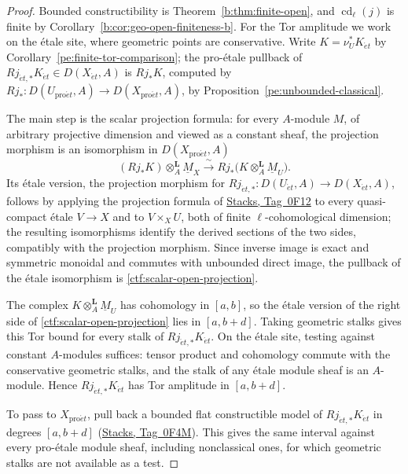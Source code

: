 \documentclass[11pt,a4paper]{article}
\numberwithin{equation}{section}
\theoremstyle{definition}
\theoremstyle{remark}
\newcommand{\et}{\acute{e}t}
\newcommand{\proet}{\mathrm{pro}\acute{e}t}
\newcommand{\stacks}[1]{\href{https://stacks.math.columbia.edu/tag/#1}{\textnormal{Stacks, Tag~#1}}}
\begin{document}
\begin{proof}
Bounded constructibility is Theorem~\ref{b:thm:finite-open}, and
$\operatorname{cd}_\ell(j)$ is finite by
Corollary~\ref{b:cor:geo-open-finiteness-b}. For the Tor amplitude we work on the \'etale site, where geometric
points are conservative. Write $K=\nu_U^*K_{\et}$ by
Corollary~\ref{pe:finite-tor-comparison}; the pro-\'etale pullback of
$Rj_{\et,*}K_{\et}\in D(X_{\et},A)$ is $Rj_*K$, computed by
$Rj_*\colon D(U_{\proet},A)\to D(X_{\proet},A)$, by
Proposition~\ref{pe:unbounded-classical}.

The main step is the scalar projection formula: for every $A$-module
$M$, of arbitrary projective dimension and viewed as a constant sheaf,
the projection morphism is an isomorphism in $D(X_{\proet},A)$
\begin{equation}\label{ctf:scalar-open-projection}
 (Rj_*K)\otimes_A^{\mathbf L}\underline M_X
   \xrightarrow{\ \sim\ }
 Rj_*\bigl(K\otimes_A^{\mathbf L}\underline M_U\bigr).
\end{equation}
Its \'etale version, the projection morphism for
$Rj_{\et,*}\colon D(U_{\et},A)\to D(X_{\et},A)$, follows by applying the projection formula of \stacks{0F12} to every
quasi-compact \'etale $V\to X$ and to $V\times_XU$, both of finite
$\ell$-cohomological dimension; the resulting isomorphisms identify the
derived sections of the two sides, compatibly with the projection
morphism. Since inverse image is exact and symmetric monoidal and
commutes with unbounded direct image, the pullback of the \'etale
isomorphism is \eqref{ctf:scalar-open-projection}.

The complex $K\otimes_A^{\mathbf L}\underline M_U$ has cohomology in
$[a,b]$, so the \'etale version of the right side of
\eqref{ctf:scalar-open-projection} lies in $[a,b+d]$. Taking geometric
stalks gives this Tor bound for every stalk of $Rj_{\et,*}K_{\et}$.
On the \'etale site, testing against constant $A$-modules suffices:
tensor product and cohomology commute with the conservative geometric
stalks, and the stalk of any \'etale module sheaf is an $A$-module.
Hence $Rj_{\et,*}K_{\et}$ has Tor amplitude in $[a,b+d]$.

To pass to $X_{\proet}$, pull back a bounded flat constructible model
of $Rj_{\et,*}K_{\et}$ in degrees $[a,b+d]$ (\stacks{0F4M}). This gives
the same interval against every pro-\'etale module sheaf, including
nonclassical ones, for which geometric stalks are not available as a
test.
\end{proof}
\end{document}

